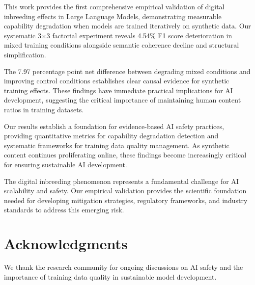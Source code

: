 \documentclass[letterpaper]{article}
\begin{document}
This work provides the first comprehensive empirical validation of digital inbreeding effects in Large Language Models, demonstrating measurable capability degradation when models are trained iteratively on synthetic data. Our systematic 3×3 factorial experiment reveals 4.54\% F1 score deterioration in mixed training conditions alongside semantic coherence decline and structural simplification.

The 7.97 percentage point net difference between degrading mixed conditions and improving control conditions establishes clear causal evidence for synthetic training effects. These findings have immediate practical implications for AI development, suggesting the critical importance of maintaining human content ratios in training datasets.

Our results establish a foundation for evidence-based AI safety practices, providing quantitative metrics for capability degradation detection and systematic frameworks for training data quality management. As synthetic content continues proliferating online, these findings become increasingly critical for ensuring sustainable AI development.

The digital inbreeding phenomenon represents a fundamental challenge for AI scalability and safety. Our empirical validation provides the scientific foundation needed for developing mitigation strategies, regulatory frameworks, and industry standards to address this emerging risk.

\section*{Acknowledgments}

We thank the research community for ongoing discussions on AI safety and the importance of training data quality in sustainable model development.



\end{document}
